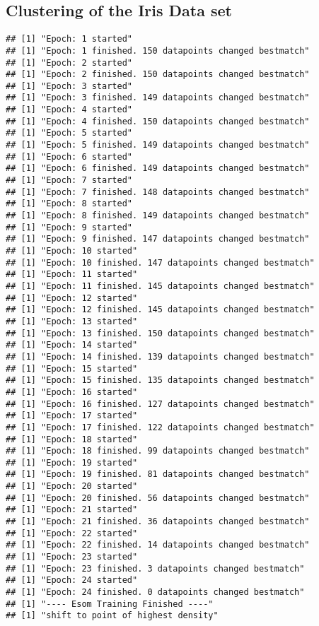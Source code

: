 \documentclass[
]{article}
\begin{document}
\subsection{Clustering of the Iris Data
set}\label{clustering-of-the-iris-data-set}

\begin{verbatim}
## [1] "Epoch: 1 started"
## [1] "Epoch: 1 finished. 150 datapoints changed bestmatch"
## [1] "Epoch: 2 started"
## [1] "Epoch: 2 finished. 150 datapoints changed bestmatch"
## [1] "Epoch: 3 started"
## [1] "Epoch: 3 finished. 149 datapoints changed bestmatch"
## [1] "Epoch: 4 started"
## [1] "Epoch: 4 finished. 150 datapoints changed bestmatch"
## [1] "Epoch: 5 started"
## [1] "Epoch: 5 finished. 149 datapoints changed bestmatch"
## [1] "Epoch: 6 started"
## [1] "Epoch: 6 finished. 149 datapoints changed bestmatch"
## [1] "Epoch: 7 started"
## [1] "Epoch: 7 finished. 148 datapoints changed bestmatch"
## [1] "Epoch: 8 started"
## [1] "Epoch: 8 finished. 149 datapoints changed bestmatch"
## [1] "Epoch: 9 started"
## [1] "Epoch: 9 finished. 147 datapoints changed bestmatch"
## [1] "Epoch: 10 started"
## [1] "Epoch: 10 finished. 147 datapoints changed bestmatch"
## [1] "Epoch: 11 started"
## [1] "Epoch: 11 finished. 145 datapoints changed bestmatch"
## [1] "Epoch: 12 started"
## [1] "Epoch: 12 finished. 145 datapoints changed bestmatch"
## [1] "Epoch: 13 started"
## [1] "Epoch: 13 finished. 150 datapoints changed bestmatch"
## [1] "Epoch: 14 started"
## [1] "Epoch: 14 finished. 139 datapoints changed bestmatch"
## [1] "Epoch: 15 started"
## [1] "Epoch: 15 finished. 135 datapoints changed bestmatch"
## [1] "Epoch: 16 started"
## [1] "Epoch: 16 finished. 127 datapoints changed bestmatch"
## [1] "Epoch: 17 started"
## [1] "Epoch: 17 finished. 122 datapoints changed bestmatch"
## [1] "Epoch: 18 started"
## [1] "Epoch: 18 finished. 99 datapoints changed bestmatch"
## [1] "Epoch: 19 started"
## [1] "Epoch: 19 finished. 81 datapoints changed bestmatch"
## [1] "Epoch: 20 started"
## [1] "Epoch: 20 finished. 56 datapoints changed bestmatch"
## [1] "Epoch: 21 started"
## [1] "Epoch: 21 finished. 36 datapoints changed bestmatch"
## [1] "Epoch: 22 started"
## [1] "Epoch: 22 finished. 14 datapoints changed bestmatch"
## [1] "Epoch: 23 started"
## [1] "Epoch: 23 finished. 3 datapoints changed bestmatch"
## [1] "Epoch: 24 started"
## [1] "Epoch: 24 finished. 0 datapoints changed bestmatch"
## [1] "---- Esom Training Finished ----"
## [1] "shift to point of highest density"
\end{verbatim}
\end{document}
